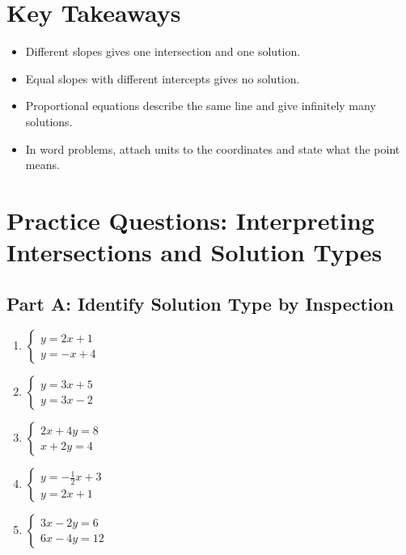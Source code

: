 \documentclass[12pt]{article}
\begin{document}
\section*{Key Takeaways}
\begin{itemize}
    \item Different slopes gives one intersection and one solution.
    \item Equal slopes with different intercepts gives no solution.
    \item Proportional equations describe the same line and give infinitely many solutions.
    \item In word problems, attach units to the coordinates and state what the point means.
\end{itemize}

\newpage


\section*{Practice Questions: Interpreting Intersections and Solution Types}

\subsection*{Part A: Identify Solution Type by Inspection}
\begin{enumerate}
    \item \(\begin{cases} y = 2x + 1 \\ y = -x + 4 \end{cases}\)
    \item \(\begin{cases} y = 3x + 5 \\ y = 3x - 2 \end{cases}\)
    \item \(\begin{cases} 2x + 4y = 8 \\ x + 2y = 4 \end{cases}\)
    \item \(\begin{cases} y = -\tfrac{1}{2}x + 3 \\ y = 2x + 1 \end{cases}\)
    \item \(\begin{cases} 3x - 2y = 6 \\ 6x - 4y = 12 \end{cases}\)
\end{enumerate}
\end{document}
